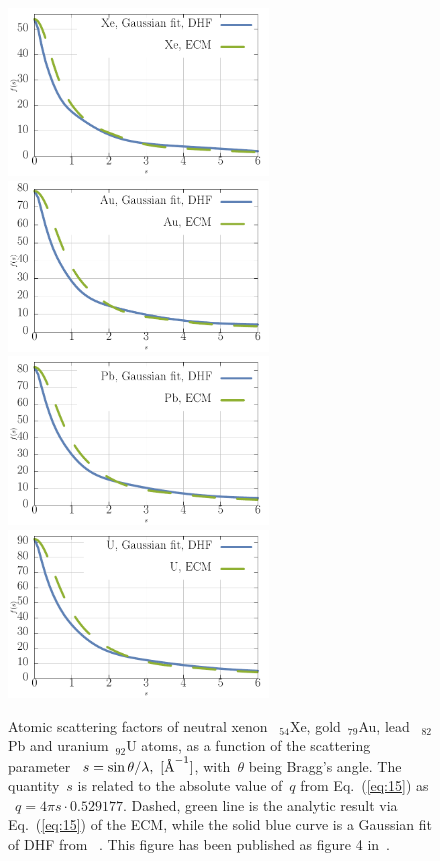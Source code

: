 \begin{figure}
  \centering  
  \includegraphics[width=69mm]{Graphs/asf_Xe.pdf}
  \includegraphics[width=69mm]{Graphs/asf_Au.pdf}
  \includegraphics[width=69mm]{Graphs/asf_Pb.pdf}
  \includegraphics[width=69mm]{Graphs/asf_U.pdf}
  \caption{Atomic scattering factors of neutral xenon
   ~$_{54}$Xe, gold~$_{79}$Au, lead
   ~$_{82}$Pb and uranium~$_{92}$U atoms, as a
    function of the scattering parameter
   ~$s = \sin\theta / \lambda,\ [\textup{\AA}^{-1}]$, with~$\theta$
    being Bragg's angle. The quantity~$s$ is related to the absolute
    value of~$q$ from Eq.~(\ref{eq:15}) as
   ~$q = 4\pi s \cdot 0.529177$. Dashed, green line is the analytic
    result via Eq.~(\ref{eq:15}) of the ECM, while the solid
    blue curve is a Gaussian fit of DHF from
   ~\cite{DHFscatter}. This figure has been published as figure 4 in~\cite{Dzikowski_2021}.}
  \label{fig:ASF}
\end{figure}

